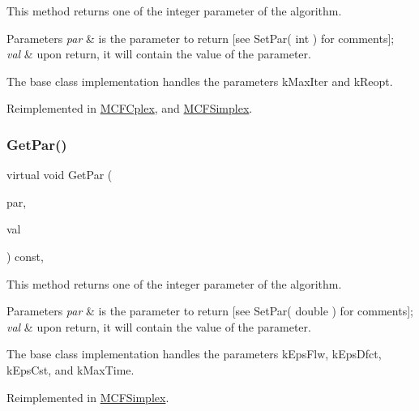 This method returns one of the integer parameter of the algorithm.


\begin{DoxyParams}{Parameters}
{\em par} & is the parameter to return \mbox{[}see Set\+Par( int ) for comments\mbox{]};\\
\hline
{\em val} & upon return, it will contain the value of the parameter.\\
\hline
\end{DoxyParams}
The base class implementation handles the parameters k\+Max\+Iter and k\+Reopt. 

Reimplemented in \mbox{\hyperlink{class_m_c_f_cplex_aebb293732f2fd2767e9ebc5e8ccae338}{M\+C\+F\+Cplex}}, and \mbox{\hyperlink{class_m_c_f_simplex_aebb293732f2fd2767e9ebc5e8ccae338}{M\+C\+F\+Simplex}}.

\mbox{\label{class_m_c_f_class_a677caf4176eef1509a0fdf87c0662897}} 
\subsubsection{\texorpdfstring{Get\+Par()}{GetPar()}\hspace{0.1cm}{\footnotesize\ttfamily [2/2]}}
{\footnotesize\ttfamily virtual void Get\+Par (\begin{DoxyParamCaption}\item[{int}]{par,  }\item[{double \&}]{val }\end{DoxyParamCaption}) const\hspace{0.3cm}{\ttfamily [inline]}, {\ttfamily [virtual]}}

This method returns one of the integer parameter of the algorithm.


\begin{DoxyParams}{Parameters}
{\em par} & is the parameter to return \mbox{[}see Set\+Par( double ) for comments\mbox{]};\\
\hline
{\em val} & upon return, it will contain the value of the parameter.\\
\hline
\end{DoxyParams}
The base class implementation handles the parameters k\+Eps\+Flw, k\+Eps\+Dfct, k\+Eps\+Cst, and k\+Max\+Time. 

Reimplemented in \mbox{\hyperlink{class_m_c_f_simplex_a56cd6bb7b0a08a99f6acc82ef4bb4e9b}{M\+C\+F\+Simplex}}.

